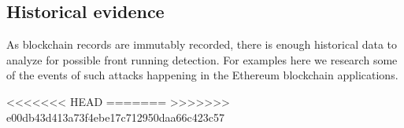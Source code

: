 %
%
%
%
%


\subsection{Historical evidence}
As blockchain records are immutably recorded, there is enough historical data to analyze for possible front running detection. For examples here we research some of the events of such attacks happening in the Ethereum blockchain applications.

<<<<<<< HEAD
=======
>>>>>>> e00db43d413a73f4ebe17c712950daa66c423c57


